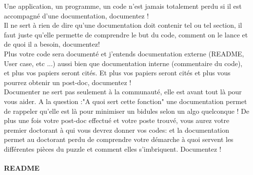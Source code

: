 Une application, un programme, un code n'est jamais totalement perdu si il est accompagné d'une documentation,
 documentez !\\

Il ne sert à rien de dire qu'une documentation doit contenir tel ou tel section, il faut juste 
qu'elle permette de comprendre le but du code, comment on le lance et de quoi il a besoin, documentez! \\

Plus votre code sera documenté et j'entends documentation externe (README, User case, etc ...) aussi 
bien que documentation interne (commentaire du code), et plus vos papiers seront cités. 
Et plus vos papiers seront cités et plus vous pourrez obtenir un post-doc, documentez ! \\

Documenter ne sert pas seulement à la communauté, elle est avant tout là pour vous aider. 
A la question :"A quoi sert cette fonction" une documentation permet de rappeler qu'elle
 est là pour minimiser un bidules selon un algo quelconque ! De plus une fois votre post-doc
 effectué et votre poste trouvé, vous aurez votre premier doctorant à qui vous devrez donner vos codes:
 et la documentation permet au doctorant perdu de comprendre votre démarche à quoi servent 
les différentes pièces du puzzle et comment elles s'imbriquent. Documentez !\\

\paragraph{README}

